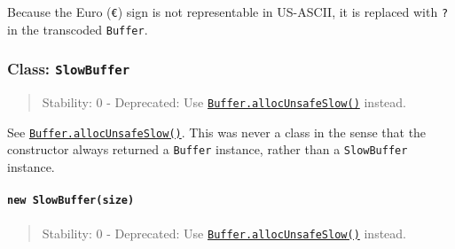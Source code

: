 \begin{Shaded}
\begin{Highlighting}[]
\NormalTok{ \{ }\OperatorTok{,}\OperatorTok{=} \NormalTok{(}\NormalTok{)}\OperatorTok{;}

\OperatorTok{=} \NormalTok{(}\NormalTok{(}\NormalTok{)}\OperatorTok{,} \OperatorTok{,} \NormalTok{)}\OperatorTok{;}
\NormalTok{(}\NormalTok{))}\OperatorTok{;}
\end{Highlighting}
\end{Shaded}

Because the Euro (\texttt{€}) sign is not representable in US-ASCII, it
is replaced with \texttt{?} in the transcoded \texttt{Buffer}.

\subsubsection{\texorpdfstring{Class:
\texttt{SlowBuffer}}{Class: SlowBuffer}}\label{class-slowbuffer}

\begin{quote}
Stability: 0 - Deprecated: Use
\hyperref[static-method-bufferallocunsafeslowsize]{\texttt{Buffer.allocUnsafeSlow()}}
instead.
\end{quote}

See
\hyperref[static-method-bufferallocunsafeslowsize]{\texttt{Buffer.allocUnsafeSlow()}}.
This was never a class in the sense that the constructor always returned
a \texttt{Buffer} instance, rather than a \texttt{SlowBuffer} instance.

\paragraph{\texorpdfstring{\texttt{new\ SlowBuffer(size)}}{new SlowBuffer(size)}}\label{new-slowbuffersize}

\begin{quote}
Stability: 0 - Deprecated: Use
\hyperref[static-method-bufferallocunsafeslowsize]{\texttt{Buffer.allocUnsafeSlow()}}
instead.
\end{quote}

